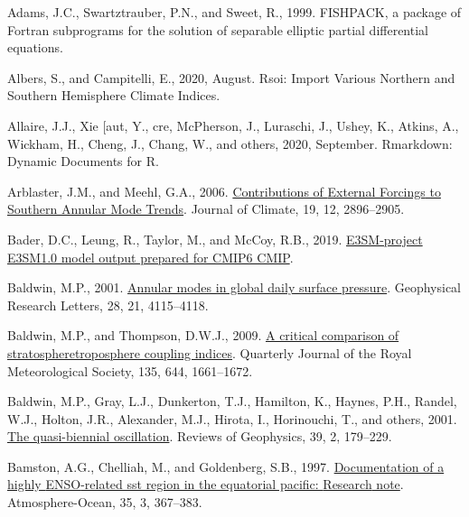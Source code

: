 \documentclass[12pt,oneside]{reedthesis}
\newlength{\cslhangindent}
\newenvironment{CSLReferences}[2] %
 {%
  \setlength{\parindent}{0pt}
  \ifodd #1 \everypar{\setlength{\hangindent}{\cslhangindent}}\ignorespaces\fi
  \ifnum #2 > 0
  \setlength{\parskip}{#2\baselineskip}
  \fi
 }%
 {}
\begin{document}
\begin{CSLReferences}{1}{0}
\leavevmode{}%
Adams, J.C., Swartztrauber, P.N., and Sweet, R., 1999. {FISHPACK}, a package of {Fortran} subprograms for the solution of separable elliptic partial differential equations.

\leavevmode{}%
Albers, S., and Campitelli, E., 2020, August. Rsoi: {Import Various Northern} and {Southern Hemisphere Climate Indices}.

\leavevmode{}%
Allaire, J.J., Xie {[}aut, Y., cre, McPherson, J., Luraschi, J., Ushey, K., Atkins, A., Wickham, H., Cheng, J., Chang, W., and others, 2020, September. Rmarkdown: {Dynamic Documents} for {R}.

\leavevmode{}%
Arblaster, J.M., and Meehl, G.A., 2006. \href{https://doi.org/10.1175/JCLI3774.1}{Contributions of {External Forcings} to {Southern Annular Mode Trends}}. Journal of Climate, 19, 12, 2896--2905.

\leavevmode{}%
Bader, D.C., Leung, R., Taylor, M., and McCoy, R.B., 2019. \href{https://doi.org/10.22033/ESGF/CMIP6.2294}{E3SM-project E3SM1.0 model output prepared for CMIP6 CMIP}.

\leavevmode{}%
Baldwin, M.P., 2001. \href{https://doi.org/10.1029/2001GL013564}{Annular modes in global daily surface pressure}. Geophysical Research Letters, 28, 21, 4115--4118.

\leavevmode{}%
Baldwin, M.P., and Thompson, D.W.J., 2009. \href{https://doi.org/10.1002/qj.479}{A critical comparison of stratosphere\textendash troposphere coupling indices}. Quarterly Journal of the Royal Meteorological Society, 135, 644, 1661--1672.

\leavevmode{}%
Baldwin, M.P., Gray, L.J., Dunkerton, T.J., Hamilton, K., Haynes, P.H., Randel, W.J., Holton, J.R., Alexander, M.J., Hirota, I., Horinouchi, T., and others, 2001. \href{https://doi.org/10.1029/1999RG000073}{The quasi-biennial oscillation}. Reviews of Geophysics, 39, 2, 179--229.

\leavevmode{}%
Bamston, A.G., Chelliah, M., and Goldenberg, S.B., 1997. \href{https://doi.org/10.1080/07055900.1997.9649597}{Documentation of a highly {ENSO}-related sst region in the equatorial pacific: {Research} note}. Atmosphere-Ocean, 35, 3, 367--383.


\end{CSLReferences}
\end{document}
